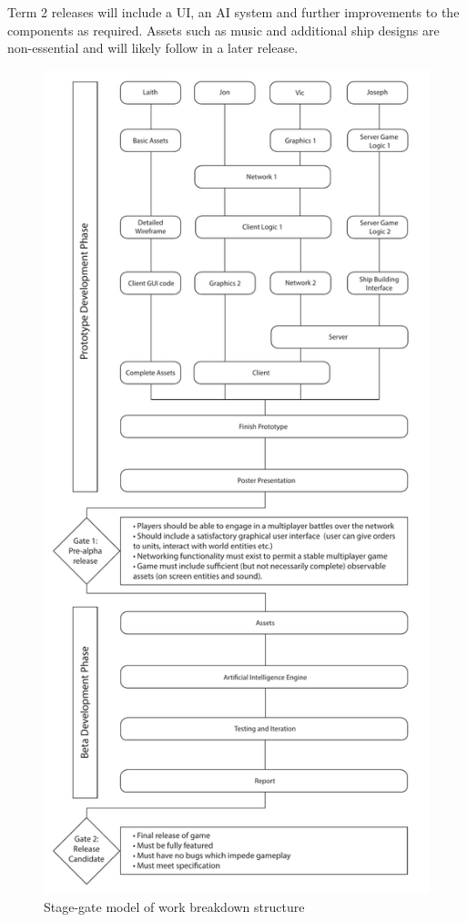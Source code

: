 Term 2 releases will include a UI, an AI system and further improvements to the components as required. Assets such as music and additional ship designs are non-essential and will likely follow in a later release.

\begin{figure}
	\includegraphics{res/stage_gate_diagram}
	\caption{Stage-gate model of work breakdown structure}
\end{figure}